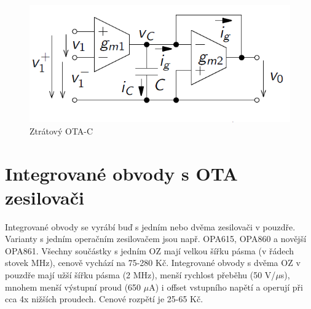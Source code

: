 \documentclass[twoside]{article}
\begin{document}
\begin{figure}[H]
\centering
\includegraphics[scale=0.5]{damp.png}
\caption{Ztrátový OTA-C \cite{4}}
\end{figure}
\section{Integrované obvody s OTA zesilovači}
Integrované obvody se vyrábí buď s jedním nebo dvěma zesilovači v pouzdře. Varianty s jedním operačním zesilovačem jsou např. OPA615, OPA860 a novější OPA861. Všechny součástky s jedním OZ mají velkou šířku pásma (v řádech stovek MHz), cenově vychází na 75-280 Kč. Integrované obvody s dvěma OZ v pouzdře mají užší šířku pásma (2 MHz), menší rychlost přeběhu (50 V/$\mu$s), mnohem menší výstupní proud (650 $\mu$A) i offset vstupního napětí a operují při cca 4x nižších proudech. Cenové rozpětí je 25-65 Kč.
\renewcommand{\arraystretch}{1.5}
\begin{table}[H]
  \caption{\label{tab:Porovnání integrovaných obvodů s jedním OTA}orovnání integrovaných obvodů s jedním OTA \cite{5}}
  \end{table}
\end{document}
